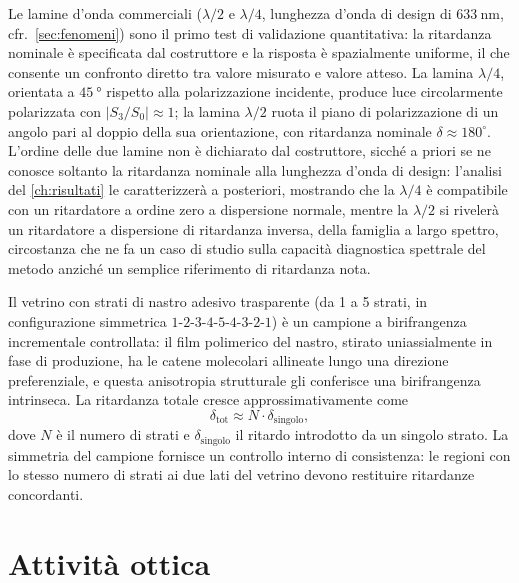 Le lamine d'onda commerciali ($\lambda/2$ e $\lambda/4$, lunghezza d'onda di design di $\SI{633}{\nano\meter}$, cfr.\ \cref{sec:fenomeni}) sono il primo test di validazione quantitativa: la ritardanza nominale è specificata dal costruttore e la risposta è spazialmente uniforme, il che consente un confronto diretto tra valore misurato e valore atteso. La lamina $\lambda/4$, orientata a $\SI{45}{\degree}$ rispetto alla polarizzazione incidente, produce luce circolarmente polarizzata con $|S_3/S_0| \approx 1$; la lamina $\lambda/2$ ruota il piano di polarizzazione di un angolo pari al doppio della sua orientazione, con ritardanza nominale $\delta \approx 180^\circ$. L'ordine delle due lamine non è dichiarato dal costruttore, sicché a priori se ne conosce soltanto la ritardanza nominale alla lunghezza d'onda di design: l'analisi del \cref{ch:risultati} le caratterizzerà a posteriori, mostrando che la $\lambda/4$ è compatibile con un ritardatore a ordine zero a dispersione normale, mentre la $\lambda/2$ si rivelerà un ritardatore a dispersione di ritardanza inversa, della famiglia a largo spettro, circostanza che ne fa un caso di studio sulla capacità diagnostica spettrale del metodo anziché un semplice riferimento di ritardanza nota.

Il vetrino con strati di nastro adesivo trasparente (da 1 a 5 strati, in configurazione simmetrica $1$-$2$-$3$-$4$-$5$-$4$-$3$-$2$-$1$) è un campione a birifrangenza incrementale controllata: %
il film polimerico del nastro, stirato uniassialmente in fase di produzione, ha le catene molecolari allineate lungo una direzione preferenziale, e questa anisotropia strutturale gli conferisce una birifrangenza intrinseca. La ritardanza totale cresce approssimativamente come
\begin{equation}
\delta_{\text{tot}} \approx N \cdot \delta_{\text{singolo}},
\label{eq:ritardo-strati}
\end{equation}
dove $N$ è il numero di strati e $\delta_{\text{singolo}}$ il ritardo introdotto da un singolo strato. La simmetria del campione fornisce un controllo interno di consistenza: le regioni con lo stesso numero di strati ai due lati del vetrino devono restituire ritardanze concordanti.


\section{Attività ottica}
\label{sec:campione-attivita-ottica}

